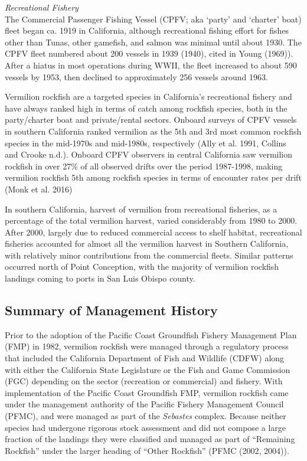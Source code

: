 \documentclass[
  english,
  a4paper,
]{article}
\begin{document}
\emph{Recreational Fishery}\\
The Commercial Passenger Fishing Vessel (CPFV; aka `party' and `charter' boat)
fleet began ca. 1919 in California, although recreational fishing effort for
fishes other than Tunas, other gamefish, and salmon was minimal until about 1930. The CPFV fleet numbered about 200 vessels in 1939 (1940), cited in Young (1969)).
After a hiatus in most operations during WWII, the fleet increased to about 590 vessels
by 1953, then declined to approximately 256 vessels around 1963.

Vermilion rockfish are a targeted species in California's recreational fishery
and have always ranked high in terms of catch among rockfish species, both in the party/charter
boat and private/rental sectors. Onboard surveys of CPFV vessels in southern California ranked vermilion as the 5th and 3rd most common rockfish species in the mid-1970s and mid-1980s, respectively (Ally et al. 1991, Collins and Crooke n.d.). Onboard CPFV observers in central California saw vermilion rockfish in over 27\% of all observed drifts over the period 1987-1998, making vermilion rockfish 5th among rockfish species in terms of encounter rates per drift (Monk et al. 2016)

In southern California, harvest of vermilion from recreational fisheries, as a percentage of the total vermilion harvest, varied considerably from 1980 to 2000. After 2000, largely due to reduced commercial access to shelf habitat, recreational fisheries accounted for almost all the vermilion harvest in Southern California, with relatively minor contributions from the commercial fleets. Similar patterns occurred north of Point Conception, with the majority of vermilion rockfish landings coming to ports in San Luis Obispo county.

\hypertarget{summary-of-management-history}{%
\subsection{Summary of Management History}\label{summary-of-management-history}}

Prior to the adoption of the Pacific Coast Groundfish Fishery Management Plan (FMP)
in 1982, vermilion rockfish were managed through a regulatory process that included the
California Department of Fish and Wildlife (CDFW) along
with either the California State Legislature or the Fish and Game Commission (FGC)
depending on the sector (recreation or commercial) and fishery. With implementation
of the Pacific Coast Groundfish FMP, vermilion rockfish came under the management
authority of the Pacific Fishery Management Council (PFMC), and were managed as part
of the \emph{Sebastes} complex. Because neither species had undergone rigorous stock assessment
and did not compose a large fraction of the landings they were classified and
managed as part of ``Remaining Rockfish'' under the larger
heading of ``Other Rockfish'' (PFMC (2002, 2004)).
\end{document}
